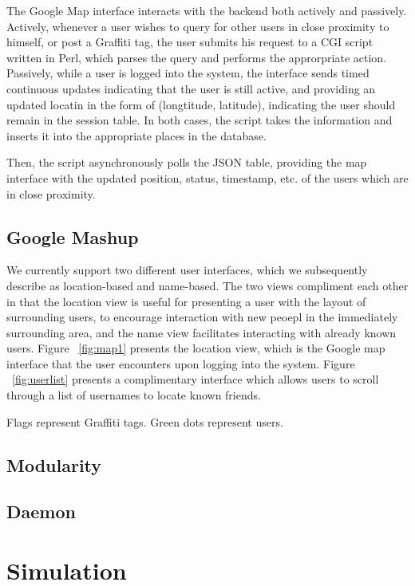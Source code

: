 \documentclass[11pt]{article}
\begin{document}
The Google Map interface interacts with the backend both actively and passively. Actively, whenever a user wishes to query for other users in close proximity to himself, or post a Graffiti tag, the user submits his request to a CGI script written in Perl, which parses the query and performs the approrpriate action. Passively, while a user is logged into the system, the interface sends timed continuous updates indicating that the user is still active, and providing an updated locatin in the form of (longtitude, latitude), indicating the user should remain in the session table. In both cases, the script takes the information and inserts it into the appropriate places in the database. 

Then, the script asynchronously polls the JSON table, providing the map interface with the updated position, status, timestamp, etc. of the users which are in close proximity. 

\subsection{Google Mashup}

We currently support two different user interfaces, which we subsequently describe as location-based and name-based. The two views compliment each other in that the location view is useful for presenting a user with the layout of surrounding users, to encourage interaction with new peoepl in the immediately surrounding area, and the name view facilitates interacting with already known users. Figure ~\ref{fig:map1} presents the location view, which is the Google map interface that the user encounters upon logging into the system. 
Figure ~\ref{fig:userlist} presents a complimentary interface which allows users to scroll through a list of usernames to locate known friends.

Flags represent Graffiti tags.
Green dots represent users.

\subsection{Modularity}



\subsection{Daemon}


\section{Simulation}
\end{document}
